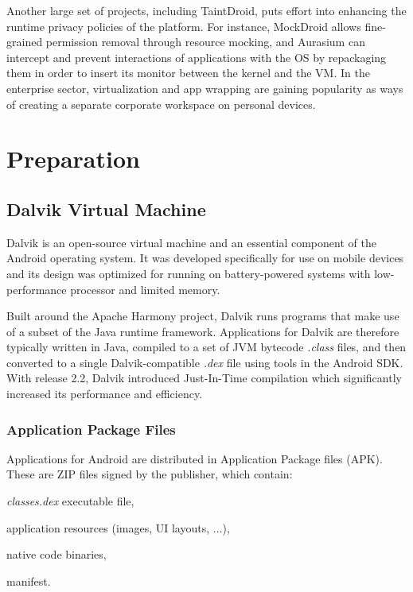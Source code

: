\documentclass[12pt,twoside,notitlepage]{report}
\begin{document}
Another large set of projects, including TaintDroid, puts effort into enhancing the runtime privacy policies of the platform. For instance, MockDroid\cite{Beresford:2011:MTP:2184489.2184500} allows fine-grained permission removal through resource mocking, and Aurasium \cite{Xu:2012:APP:2362793.2362820} can intercept and prevent interactions of applications with the OS by repackaging them in order to insert its monitor between the kernel and the VM. In the enterprise sector, virtualization\cite{web:Virtualization} and app wrapping\cite{web:AppWrapping} are gaining popularity as ways of creating a separate corporate workspace on personal devices.

\cleardoublepage
\chapter{Preparation}

\section{Dalvik Virtual Machine}

Dalvik is an open-source virtual machine and an essential component of the Android operating system. It was developed specifically for use on mobile devices and its design was optimized for running on battery-powered systems with low-performance processor and limited memory. 

Built around the Apache Harmony project, Dalvik runs programs that make use of a subset of the Java runtime framework. Applications for Dalvik are therefore typically written in Java, compiled to a set of JVM bytecode \emph{.class} files, and then converted to a single Dalvik-compatible \emph{.dex} file\cite{web:DalvikDex} using tools in the Android SDK. With release 2.2, Dalvik introduced Just-In-Time compilation which significantly increased its performance and efficiency\cite{web:DalvikJit}.

\subsection{Application Package Files}

Applications for Android are distributed in Application Package files (APK). These are ZIP files signed by the publisher, which contain:
\begin{inparaenum}[(i)]
\item \emph{classes.dex} executable file,
\item application resources (images, UI layouts, ...),
\item native code binaries,
\item manifest.
\end{inparaenum}
\end{document}
